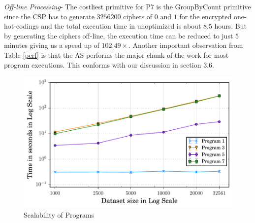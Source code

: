 \textit{Off-line Processing}-
The costliest primitive for P7 is the \textsf{GroupByCount} primitive since the \textsf{CSP} has to generate $3256200$ ciphers of $0$ and $1$ for the encrypted one-hot-codings and the total execution time in unoptimized \system is about 8.5 hours. But by generating the ciphers off-line, the execution time can be reduced to just $5$ minutes giving us a speed up of $102.49\times$.
Another important observation from Table \ref{perf} is that the \textsf{AS} performs the major chunk of the work for most program executions. This conforms with our discussion in section 3.6.
 \begin{figure}[ht]
    
     \includegraphics[width=0.5\linewidth]{scale_finals.pdf}
        \caption{Scalability of \system Programs }\label{scale}
    \end{figure}
